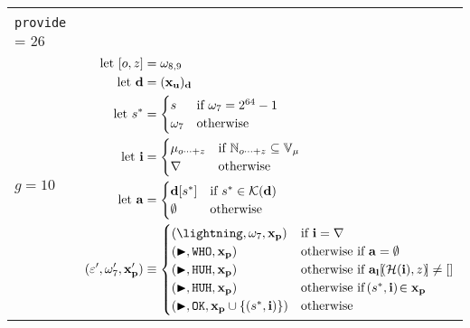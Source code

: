 \begin{longtable}{p{3.5cm} p{12.5cm}}
  \makecell*[l]{
  $\Omega_\Aries(\gascounter, \registers, \memory, (\mathbf{x}, \mathbf{y}), s)$ \\
  \texttt{provide} = 26 \\
  $g = 10$} &
  $\begin{aligned}
    \using [o, z] &= \registers_{8, 9} \\
    \using \mathbf{d} &= (\mathbf{x}_\mathbf{u})_\mathbf{d}\\
    \using s^* &= \begin{cases}
      s &\when \registers_7 = 2^{64} - 1 \\
      \registers_7 &\otherwise
    \end{cases} \\
    \using \mathbf{i} &= \begin{cases}
      \memory\subrange{o}{z} &\when \Nrange{o}{z} \subseteq \readable{\memory} \\
      \error &\otherwise
    \end{cases} \\
    \using \mathbf{a} &= \begin{cases}
      \mathbf{d}[s^*] &\when s^* \in \keys{\mathbf{d}} \\
      \none &\otherwise
    \end{cases} \\
    (\execst', \registers'_7, \mathbf{x}'_\mathbf{p}) &\equiv \begin{cases}
      (\panic, \registers_7, \mathbf{x}_\mathbf{p}) &\when \mathbf{i} = \error \\
      (\continue, \mathtt{WHO}, \mathbf{x}_\mathbf{p}) &\otherwhen \mathbf{a} = \none \\
      (\continue, \mathtt{HUH}, \mathbf{x}_\mathbf{p}) &\otherwhen \mathbf{a}_\mathbf{l}[\tup{\blake(\mathbf{i}), z}] \ne \sq{} \\
      (\continue, \mathtt{HUH}, \mathbf{x}_\mathbf{p}) &\otherwhen \tup{s^*, \mathbf{i}} \in \mathbf{x}_\mathbf{p} \\
      (\continue, \mathtt{OK}, \mathbf{x}_\mathbf{p} \cup \set{\tup{s^*, \mathbf{i}}}) &\otherwise \\
    \end{cases} \\
  \end{aligned}$\\
  \bottomrule
\end{longtable}

